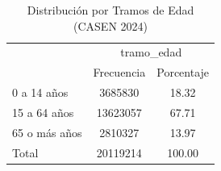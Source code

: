 \begin{table}[htbp]\centering
\def\sym#1{\ifmmode^{#1}\else\(^{#1}\)\fi}
\caption{Distribución por Tramos de Edad (CASEN 2024)}
\begin{tabular}{l*{1}{cc}}
\toprule
            &\multicolumn{2}{c}{tramo\_edad}\\
            &  Frecuencia&  Porcentaje\\
\midrule
0 a 14 años &     3685830&       18.32\\
15 a 64 años&    13623057&       67.71\\
65 o más años&     2810327&       13.97\\
Total       &    20119214&      100.00\\
\bottomrule
\end{tabular}
\end{table}
